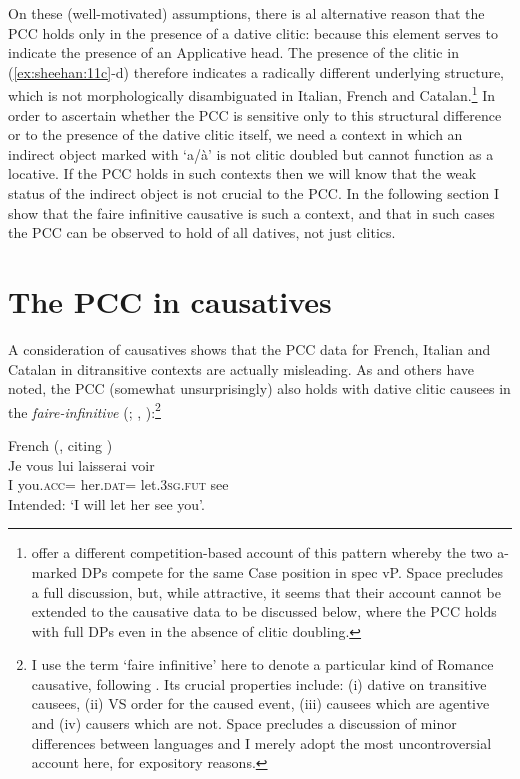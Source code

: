 \documentclass[output=paper,colorlinks,citecolor=brown,nonflat]{./langscibook}
\begin{document}
On these (well-motivated) assumptions, there is al alternative reason that the PCC holds only in the presence of a dative clitic:  because this element serves to indicate the presence of an Applicative head. The presence of the clitic in (\ref{ex:sheehan:11c}-d) therefore indicates a radically different underlying structure, which is not morphologically disambiguated in Italian, French and Catalan.\footnote{\citet{OrmazabalRomero2013Borealis} offer a different competition-based account of this pattern whereby the two a-marked DPs compete for the same Case position in spec vP. Space precludes a full discussion, but, while attractive, it seems that their account cannot be extended to the causative data to be discussed below, where the PCC holds with full DPs even in the absence of clitic doubling.} In order to ascertain whether the PCC is sensitive only to this structural difference or to the presence of the dative clitic itself, we need a context in which an indirect object marked with ‘a/à’ is not clitic doubled but cannot function as a locative. If the PCC holds in such contexts then we will know that the weak status of the indirect object is not crucial to the PCC. In the following section I show that the faire infinitive causative is such a context, and that in such cases the PCC can be observed to hold of all datives, not just clitics.

\section{The PCC in causatives}\label{sec:sheehan:3}

A consideration of causatives shows that the PCC data for French, Italian and Catalan in ditransitive contexts are actually misleading. As \citet{Bonet1991} and others have noted, the PCC (somewhat unsurprisingly) also holds with dative clitic causees in the \textit{faire-infinitive} (\citealt{Postal1981}; \citealt{Quicoli1984}, \citealt{Rezac2008}):\footnote{I use the term ‘faire infinitive’ here to denote a particular kind of Romance causative, following \citet{Kayne1975}. Its crucial properties include: (i) dative on transitive causees, (ii) VS order for the caused event, (iii) causees which are agentive and (iv) causers which are not. Space precludes a discussion of minor differences between languages and I merely adopt the most uncontroversial account here, for expository reasons.} 

\ea%
    \label{ex:sheehan:13}
    French (\citealt[66]{Rezac2008}, citing \citealt{Postal1981, Quicoli1984})\\
    \gll    *Je   vous     lui           laisserai   voir\\
            I      you.\textsc{acc}=   her.\textsc{dat=}   let.3\textsc{sg}.\textsc{fut}    see\\
    \glt    Intended: ‘I will let her see you'.
\z
\end{document}
